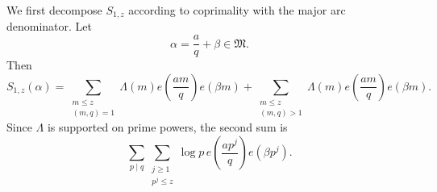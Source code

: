 \documentclass[12pt,reqno]{amsart}
\numberwithin{equation}{section}
\theoremstyle{plain}
\theoremstyle{remark}
\newcommand{\majorarc}{\mathfrak{M}}
\begin{document}
We first decompose $S_{1,z}$ according to coprimality with the major arc
denominator.  Let
\[
 \alpha=\frac{a}{q}+\beta\in\majorarc.
\]
Then
\begin{equation}\label{S1-coprime-splitting}
 S_{1,z}(\alpha)
 =
 \sum_{\substack{m\leq z\\(m,q)=1}}
 \Lambda(m)e\left(\frac{am}{q}\right)e(\beta m)
 +
 \sum_{\substack{m\leq z\\(m,q)>1}}
 \Lambda(m)e\left(\frac{am}{q}\right)e(\beta m).
\end{equation}
Since $\Lambda$ is supported on prime powers, the second sum is
\begin{equation}\label{S1-noncoprime-part}
 \sum_{p\mid q}
 \sum_{\substack{j\geq1\\p^j\leq z}}
 \log p\,
 e\left(\frac{ap^j}{q}\right)e(\beta p^j).
\end{equation}
\end{document}

